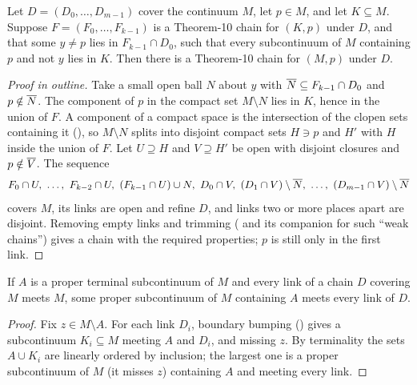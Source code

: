 
\begin{lemma}\label{lem:surgery}
Let $D=(D_0,\dots,D_{m-1})$ cover the continuum $M$, let $p\in M$, and let $K\subseteq M$. Suppose $F=(F_0,\dots,F_{k-1})$ is a Theorem-10 chain for
$(K,p)$ under $D$, and that some $y\ne p$ lies in $F_{k-1}\cap D_0$, such that every subcontinuum of $M$ containing $p$ and not $y$ lies in $K$. Then there
is a Theorem-10 chain for $(M,p)$ under $D$.
\end{lemma}

\begin{proof}[Proof in outline]
Take a small open ball $N$ about $y$ with $\overline{N}\subseteq F_{k-1}\cap D_0$ and $p\notin\overline{N}$. The component of $p$ in the compact set $M\setminus N$ lies in
$K$, hence in the union of $F$. A component of a compact space is the intersection of the clopen sets containing it (), so $M\setminus N$
splits into disjoint compact sets $H\ni p$ and $H'$ with $H$ inside the union of $F$. Let $U\supseteq H$ and $V\supseteq H'$ be open with disjoint
closures and $p\notin\overline{V}$. The sequence
\[
F_0\cap U,\ \dots,\ F_{k-2}\cap U,\ (F_{k-1}\cap U)\cup N,\ D_0\cap V,\ (D_1\cap V)\setminus\cl N,\ \dots,\ (D_{m-1}\cap V)\setminus\cl N
\]
covers $M$, its links are open and refine $D$, and links two or more places apart are disjoint. Removing empty links and trimming (
and its companion for such ``weak chains'') gives a chain with the required properties; $p$ is still only in the first link.
\end{proof}


\begin{lemma}\label{lem:composant-step}
If $A$ is a proper terminal subcontinuum of $M$ and every link of a chain $D$ covering $M$ meets $M$, some proper subcontinuum of $M$ containing $A$ meets
every link of $D$.
\end{lemma}

\begin{proof}
Fix $z\in M\setminus A$. For each link $D_i$, boundary bumping () gives a subcontinuum $K_i\subseteq M$ meeting $A$ and $D_i$, and missing
$z$. By terminality the sets $A\cup K_i$ are linearly ordered by inclusion; the largest one is a proper subcontinuum of $M$ (it misses $z$) containing $A$
and meeting every link.
\end{proof}


